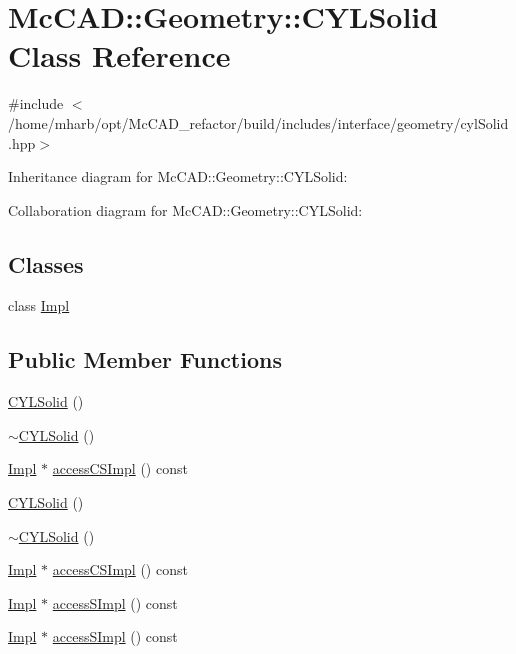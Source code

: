 \hypertarget{classMcCAD_1_1Geometry_1_1CYLSolid}{}\section{Mc\+C\+AD\+:\+:Geometry\+:\+:C\+Y\+L\+Solid Class Reference}
\label{classMcCAD_1_1Geometry_1_1CYLSolid}


{\ttfamily \#include $<$/home/mharb/opt/\+Mc\+C\+A\+D\+\_\+refactor/build/includes/interface/geometry/cyl\+Solid.\+hpp$>$}



Inheritance diagram for Mc\+C\+AD\+:\+:Geometry\+:\+:C\+Y\+L\+Solid\+:


Collaboration diagram for Mc\+C\+AD\+:\+:Geometry\+:\+:C\+Y\+L\+Solid\+:
\subsection*{Classes}
\begin{DoxyCompactItemize}
\item 
class \hyperlink{classMcCAD_1_1Geometry_1_1CYLSolid_1_1Impl}{Impl}
\end{DoxyCompactItemize}
\subsection*{Public Member Functions}
\begin{DoxyCompactItemize}
\item 
\hyperlink{classMcCAD_1_1Geometry_1_1CYLSolid_a170b8fe6e311517209ba9d4363d7ed5a}{C\+Y\+L\+Solid} ()
\item 
\hyperlink{classMcCAD_1_1Geometry_1_1CYLSolid_ad83f5a6a4161bc1f8181b10f9695011d}{$\sim$\+C\+Y\+L\+Solid} ()
\item 
\hyperlink{classMcCAD_1_1Geometry_1_1CYLSolid_1_1Impl}{Impl} $\ast$ \hyperlink{classMcCAD_1_1Geometry_1_1CYLSolid_ac62f8a08c4db70c97c980a131207452d}{access\+C\+S\+Impl} () const
\item 
\hyperlink{classMcCAD_1_1Geometry_1_1CYLSolid_a170b8fe6e311517209ba9d4363d7ed5a}{C\+Y\+L\+Solid} ()
\item 
\hyperlink{classMcCAD_1_1Geometry_1_1CYLSolid_ad83f5a6a4161bc1f8181b10f9695011d}{$\sim$\+C\+Y\+L\+Solid} ()
\item 
\hyperlink{classMcCAD_1_1Geometry_1_1CYLSolid_1_1Impl}{Impl} $\ast$ \hyperlink{classMcCAD_1_1Geometry_1_1CYLSolid_aa03de7d587fa2bb9ddd1c4e0dab11b19}{access\+C\+S\+Impl} () const
\item 
\hyperlink{classMcCAD_1_1Geometry_1_1CYLSolid_1_1Impl}{Impl} $\ast$ \hyperlink{classMcCAD_1_1Geometry_1_1Solid_a41304db7cdf4762342ea833b15764180}{access\+S\+Impl} () const
\item 
\hyperlink{classMcCAD_1_1Geometry_1_1CYLSolid_1_1Impl}{Impl} $\ast$ \hyperlink{classMcCAD_1_1Geometry_1_1Solid_a1d058cac2d5619e21813a16706dc1826}{access\+S\+Impl} () const
\end{DoxyCompactItemize}
